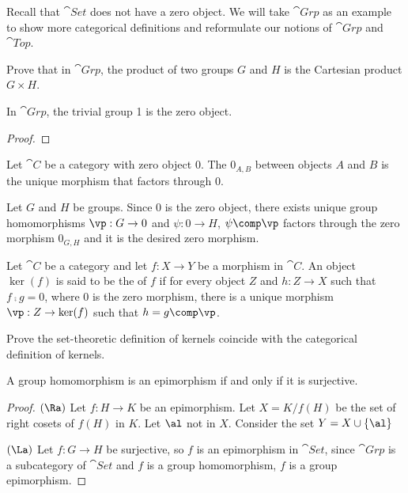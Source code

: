 \documentclass[10pt]{article}
\begin{document}
\par
Recall that $\cat{Set}$ does not have a zero object. We will take $\cat{Grp}$ as an example to show more categorical definitions and reformulate our notions of $\cat{Grp}$ and $\cat{Top}$.
\begin{problem}
    Prove that in $\cat{Grp}$, the product of two groups $G$ and $H$ is the Cartesian product $G\times H$.
\end{problem}
\begin{proposition}
    In $\cat{Grp}$, the trivial group 1 is the zero object.
\end{proposition}
\begin{proof}
    
\end{proof}
\begin{definition}
    Let $\cat{C}$ be a category with zero object 0. The  ${0}_{A,B}$ between objects $A$ and $B$ is the unique morphism that factors through 0.
\end{definition}
\par
Let $G$ and $H$ be groups. Since $0$ is the zero object, there exists unique group homomorphisms $\vp:G\to 0$ and $\psi:0\to H$, $\psi\comp\vp$ factors through the zero morphism ${0}_{G,H}$ and it is the desired zero morphism.
\begin{definition}
    Let $\cat{C}$ be a category and let $f:X\to Y$ be a morphism in $\cat{C}$. An object $\ker(f)$ is said to be the  of $f$ if for every object $Z$ and $h:Z\to X$ such that $f\comp g=0$, where $0$ is the zero morphism, there is a unique morphism $\vp:Z\to\ker(f)$ such that $h=g\comp\vp$.
\end{definition}
\begin{problem}
    Prove the set-theoretic definition of kernels coincide with the categorical definition of kernels.
\end{problem}
\begin{proposition}
    A group homomorphism is an epimorphism if and only if it is surjective.    
\end{proposition}
\begin{proof}
    $(\Ra)$ Let $f:H\to K$ be an epimorphism. Let $X=K/f(H)$ be the set of right cosets of $f(H)$ in $K$. Let $\al$ not in $X$. Consider the set $Y=X\cup\{\al\}$



    $(\La)$ Let $f:G\to H$ be surjective, so $f$ is an epimorphism in $\cat{Set}$, since $\cat{Grp}$ is a subcategory of $\cat{Set}$ and $f$ is a group homomorphism, $f$ is a group epimorphism.
\end{proof}
\end{document}
